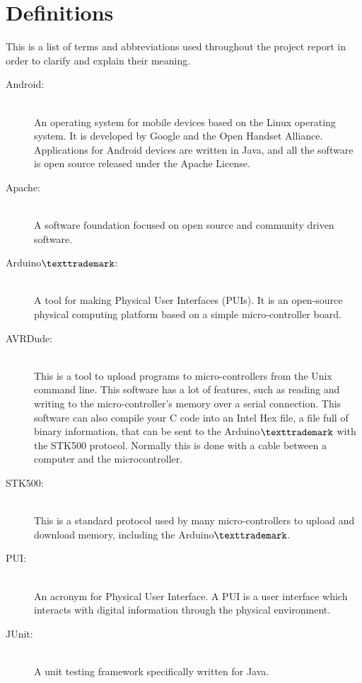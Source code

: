 \section{Definitions}
This is a list of terms and abbreviations used throughout the project report in order to clarify and explain their meaning.

\begin{description}

\item[Android:]\hfill \\
An operating system for mobile devices based on the Linux operating system. It is developed by Google and the Open Handset Alliance. Applications for Android devices are written in Java, and all the software is open source released under the Apache License.

\item[Apache:] \hfill \\
A software foundation focused on open source and community driven software.

\item[Arduino$\texttrademark$:]\hfill \\
A tool for making Physical User Interfaces (PUIs). It is an open-source physical computing platform based on a simple micro-controller board.

\item[AVRDude:]\hfill \\
This is a tool to upload programs to micro-controllers from the Unix command line. This software has a lot of features, such as reading and writing to the micro-controller's memory over a serial connection. This software can also compile your C code into an Intel Hex file, a file full of binary information, that can be sent to the Arduino$\texttrademark$ with the STK500 protocol. Normally this is done with a cable between a computer and the microcontroller.

\item[STK500:]\hfill \\
This is a standard protocol used by many micro-controllers to upload and download memory, including the Arduino$\texttrademark$.

\item[PUI:]\hfill \\
An acronym for Physical User Interface. A PUI is a user interface which interacts with digital information through the physical environment.

\item[JUnit:]\hfill \\
A unit testing framework specifically written for Java.

\end{description}

